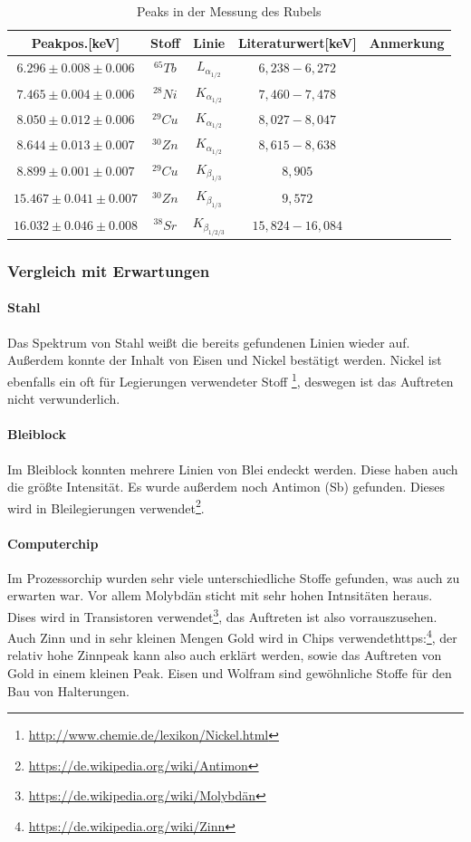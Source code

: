 \documentclass[12pt,a4paper]{article}
\begin{document}
\begin{table}[H]
\center
\begin{tabular}{|c|c|c|c|c|}
\hline 
Peakpos.[keV] & Stoff & Linie & Literaturwert[keV] & Anmerkung \\
\hline 
$6.296 \pm 0.008 \pm 0.006$& $^{65}Tb$ & $L_{\alpha_{1/2}}$ & $6,238-6,272$ & \\
\hline 
$7.465 \pm 0.004 \pm 0.006$ & $^{28}Ni$ & $K_{\alpha_{1/2}}$ & $7,460-7,478$ & \\
\hline
$8.050 \pm 0.012 \pm 0.006$ & $^{29}Cu$ & $K_{\alpha_{1/2}}$ & $8,027-8,047$ & \\
\hline
$8.644 \pm 0.013 \pm 0.007$ & $^{30}Zn$ & $K_{\alpha_{1/2}}$ & $8,615-8,638$ & \\
\hline
$8.899 \pm 0.001 \pm 0.007$ & $^{29}Cu$ & $K_{\beta_{1/3}}$ & $8,905$ & \\
\hline
$15.467 \pm 0.041 \pm 0.007$ & $^{30}Zn$ & $K_{\beta_{1/3}}$ & $9,572$ & \\
\hline
$16.032 \pm 0.046 \pm 0.008$ & $^{38}Sr$ & $K_{\beta_{1/2/3}}$ & $15,824-16,084$ & \\
\hline
\end{tabular} 
\caption{Peaks in der Messung des Rubels}
\label{prop_rubel}
\end{table}

\newpage
\subsubsection{Vergleich mit Erwartungen}
\paragraph{Stahl}
Das Spektrum von Stahl weißt die bereits gefundenen Linien wieder auf. Außerdem konnte der Inhalt von Eisen und Nickel bestätigt werden. Nickel ist ebenfalls ein oft für Legierungen verwendeter Stoff \footnote{\url{http://www.chemie.de/lexikon/Nickel.html}}, deswegen ist das Auftreten nicht verwunderlich.

\paragraph{Bleiblock}
Im Bleiblock konnten mehrere Linien von Blei endeckt werden. Diese haben auch die größte Intensität. Es wurde außerdem noch Antimon (Sb) gefunden. Dieses wird in Bleilegierungen verwendet\footnote{\url{https://de.wikipedia.org/wiki/Antimon}}.

\paragraph{Computerchip}
Im Prozessorchip wurden sehr viele unterschiedliche Stoffe gefunden, was auch zu erwarten war. Vor allem Molybdän sticht mit sehr hohen Intnsitäten heraus. Dises wird in Transistoren verwendet\footnote{\url{https://de.wikipedia.org/wiki/Molybdän}}, das Auftreten ist also vorrauszusehen. Auch Zinn und in sehr kleinen Mengen Gold wird in Chips verwendethttps:\footnote{\url{https://de.wikipedia.org/wiki/Zinn}}, der relativ hohe Zinnpeak kann also auch erklärt werden, sowie das Auftreten von Gold in einem kleinen Peak. Eisen und Wolfram sind gewöhnliche Stoffe für den Bau von Halterungen.
\end{document}
